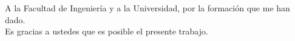 \begin{dedication}
A la Facultad de Ingeniería y a la  Universidad, por la formación que me han dado.\\
Es gracias a ustedes que es posible el presente trabajo.\\
\end{dedication}
